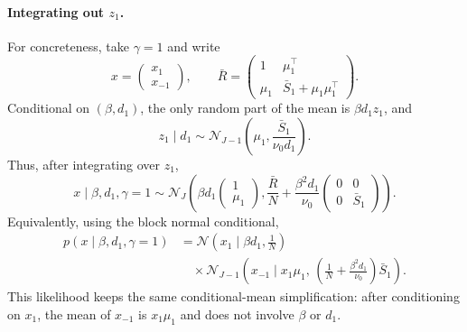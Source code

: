 \documentclass[11pt]{article}
\newcommand{\Rbar}{\bar R}
\newcommand{\Sbar}{\bar S}
\newcommand{\Normal}{\mathcal N}
\begin{document}
\paragraph{Integrating out \(z_1\).}
For concreteness, take \(\gamma=1\) and write
\[
x=
\begin{pmatrix}
x_1\\x_{-1}
\end{pmatrix},
\qquad
\Rbar=
\begin{pmatrix}
1 & \mu_1^\top\\
\mu_1 & \Sbar_1+\mu_1\mu_1^\top
\end{pmatrix}.
\]
Conditional on \((\beta,d_1)\), the only random part of the mean is
\(\beta d_1z_1\), and
\[
z_1\mid d_1
\sim
\Normal_{J-1}\left(\mu_1,\frac{\Sbar_1}{\nu_0d_1}\right).
\]
Thus, after integrating over \(z_1\),
\[
x\mid \beta,d_1,\gamma=1
\sim
\Normal_J\left(
\beta d_1
\begin{pmatrix}
1\\\mu_1
\end{pmatrix},
\frac{\Rbar}{N}
+\frac{\beta^2d_1}{\nu_0}
\begin{pmatrix}
0 & 0\\
0 & \Sbar_1
\end{pmatrix}
\right).
\]
Equivalently, using the block normal conditional,
\begin{align}
p(x\mid \beta,d_1,\gamma=1)
&=
\Normal\left(x_1\mid \beta d_1,\frac{1}{N}\right)
\nonumber\\
&\quad\times
\Normal_{J-1}\left(
x_{-1}\mid x_1\mu_1,\,
\left(\frac{1}{N}+\frac{\beta^2d_1}{\nu_0}\right)\Sbar_1
\right).
\end{align}
This likelihood keeps the same conditional-mean simplification:
after conditioning on \(x_1\), the mean of \(x_{-1}\) is \(x_1\mu_1\)
and does not involve \(\beta\) or \(d_1\).
\end{document}
